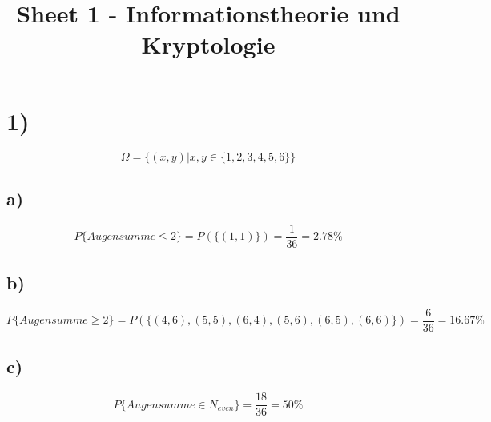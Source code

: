 \documentclass{article}
\begin{document}
  \title{Sheet 1 - Informationstheorie und Kryptologie}
  \date{}
  \author{}

  \maketitle

\section*{1)}
  \[ \Omega = \{(x,y) |x,y \in \{ 1,2,3,4,5,6 \} \} \]
  
  \subsection*{a)}
    \[ P \{ Augensumme \leq 2 \} = P(\{ (1,1)\} ) = \frac{1}{36} = 2.78\% \]
    
  \subsection*{b)}
    \[ P \{ Augensumme \geq 2 \} = P(\{ (4,6), (5,5), (6,4), (5,6), (6,5), (6,6)\} ) = \frac{6}{36} = 16.67\% \]
    
  \subsection*{c)}
    \[ P \{ Augensumme \in N_{even} \} = \frac{18}{36} = 50\% \]
    
    
\end{document}
